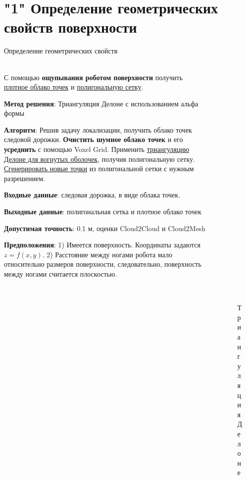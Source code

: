\section{"1" Определение геометрических свойств поверхности}

\begin{frame}[t]{Определение геометрических свойств}
\framesubtitle{}
    \begin{columns}[T,onlytextwidth]
        \begin{column}{0.69\textwidth}
            \small
            С помощью \textbf{ощупывания роботом поверхности} получить \underline{плотное облако точек} и \underline{полигональную сетку}.

            \textbf{Метод решения}: Триангуляция Делоне с использованием альфа формы

            \textbf{Алгоритм}: Решив задачу локализации, получить облако точек следовой дорожки. \textbf{Очистить шумное облако точек} и его \textbf{усреднить} с помощью Voxel Grid. Применить \underline{триангуляцию Делоне для вогнутых оболочек}, получив полигональную сетку. \underline{Сгенерировать новые точки} из полигональной сетки с нужным разрешением.

            \textbf{Входные данные}: следовая дорожка, в виде облака точек.
            
            \textbf{Выходные данные}: полигональная сетка и плотное облако точек
            
            \textbf{Допустимая точность}: 0.1 м, оценки Cloud2Cloud и Cloud2Mesh

            \textbf{Предположения}: 1) Имеется поверхность. Координаты задаются $z=f(x,y)$. 2) Расстояние между ногами робота мало относительно размеров поверхности, следовательно, поверхность между ногами считается плоскостью.   
        \end{column}
        \begin{column}{0.29\textwidth}
            \begin{figure}[H]
                \begin{subfigure}{0.99\textwidth}
                    \centering\includegraphics[height=2.5cm,width=1\textwidth,keepaspectratio]{../images/slides/delone_mag.png}
                    \caption*{Триангуляция Делоне}
                \end{subfigure}


\end{figure}
\end{column}
\end{columns}
\end{frame}
